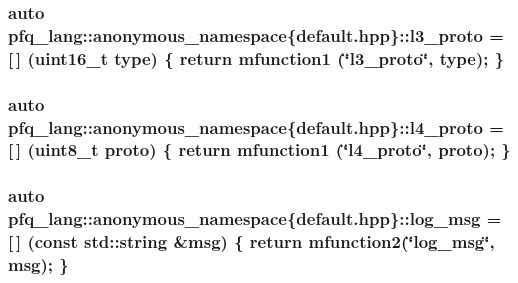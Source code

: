 \hypertarget{namespacepfq__lang_1_1anonymous__namespace_02default_8hpp_03_aed01dd5380a873d92397ec0d4c07abac}{
\subsubsection[{l3\+\_\+proto}]{\setlength{\rightskip}{0pt plus 5cm}auto pfq\+\_\+lang\+::anonymous\+\_\+namespace\{default.\+hpp\}\+::l3\+\_\+proto = \mbox{[}$\,$\mbox{]} (uint16\+\_\+t type) \{ return {\bf mfunction1} (\char`\"{}l3\+\_\+proto\char`\"{}, type); \}}}\label{namespacepfq__lang_1_1anonymous__namespace_02default_8hpp_03_aed01dd5380a873d92397ec0d4c07abac}
\hypertarget{namespacepfq__lang_1_1anonymous__namespace_02default_8hpp_03_a75da77904f1cff4cc42fc3a081f80670}{
\subsubsection[{l4\+\_\+proto}]{\setlength{\rightskip}{0pt plus 5cm}auto pfq\+\_\+lang\+::anonymous\+\_\+namespace\{default.\+hpp\}\+::l4\+\_\+proto = \mbox{[}$\,$\mbox{]} (uint8\+\_\+t proto) \{ return {\bf mfunction1} (\char`\"{}l4\+\_\+proto\char`\"{}, proto); \}}}\label{namespacepfq__lang_1_1anonymous__namespace_02default_8hpp_03_a75da77904f1cff4cc42fc3a081f80670}
\hypertarget{namespacepfq__lang_1_1anonymous__namespace_02default_8hpp_03_a6e8f4a76ce585b69d5de50cfa6a08f8a}{
\subsubsection[{log\+\_\+msg}]{\setlength{\rightskip}{0pt plus 5cm}auto pfq\+\_\+lang\+::anonymous\+\_\+namespace\{default.\+hpp\}\+::log\+\_\+msg = \mbox{[}$\,$\mbox{]} (const std\+::string \&msg) \{ return {\bf mfunction2}(\char`\"{}log\+\_\+msg\char`\"{}, msg); \}}}\label{namespacepfq__lang_1_1anonymous__namespace_02default_8hpp_03_a6e8f4a76ce585b69d5de50cfa6a08f8a}

